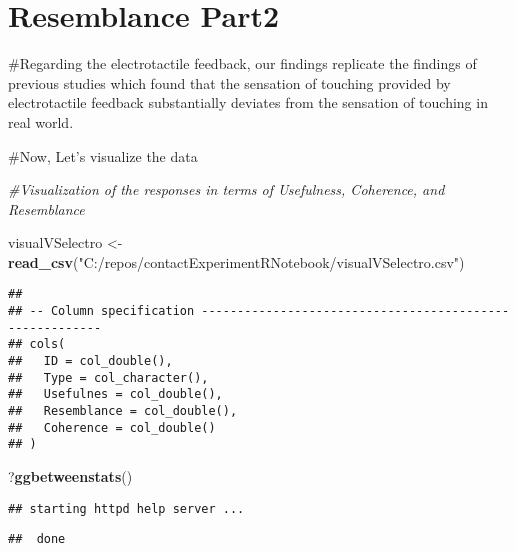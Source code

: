 \documentclass[
]{article}
\newenvironment{Shaded}{\begin{snugshade}}{\end{snugshade}}
\newcommand{\CommentTok}[1]{\textcolor[rgb]{0.56,0.35,0.01}{\textit{#1}}}
\newcommand{\KeywordTok}[1]{\textcolor[rgb]{0.13,0.29,0.53}{\textbf{#1}}}
\newcommand{\NormalTok}[1]{#1}
\newcommand{\StringTok}[1]{\textcolor[rgb]{0.31,0.60,0.02}{#1}}
\begin{document}
\hypertarget{resemblance-part2}{%
\section{Resemblance Part2}\label{resemblance-part2}}

\#Regarding the electrotactile feedback, our findings replicate the
findings of previous studies which found that the sensation of touching
provided by electrotactile feedback substantially deviates from the
sensation of touching in real world.

\#Now, Let's visualize the data

\begin{Shaded}
\begin{Highlighting}[]
\CommentTok{#Visualization of the responses in terms of Usefulness, Coherence, and Resemblance}

\NormalTok{visualVSelectro <-}\StringTok{ }\KeywordTok{read_csv}\NormalTok{(}\StringTok{"C:/repos/contactExperimentRNotebook/visualVSelectro.csv"}\NormalTok{)}
\end{Highlighting}
\end{Shaded}

\begin{verbatim}
## 
## -- Column specification --------------------------------------------------------
## cols(
##   ID = col_double(),
##   Type = col_character(),
##   Usefulnes = col_double(),
##   Resemblance = col_double(),
##   Coherence = col_double()
## )
\end{verbatim}

\begin{Shaded}
\begin{Highlighting}[]
\NormalTok{?}\KeywordTok{ggbetweenstats}\NormalTok{()}
\end{Highlighting}
\end{Shaded}

\begin{verbatim}
## starting httpd help server ...
\end{verbatim}

\begin{verbatim}
##  done
\end{verbatim}
\end{document}
